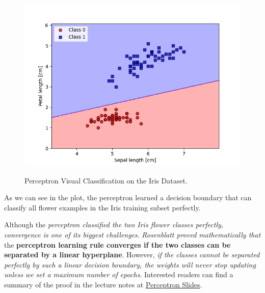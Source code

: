 \documentclass[../machine_learning_scikit.tex]{subfiles}
\begin{document}
    \begin{figure}[h]
        \begin{minipage}{\textwidth}
            \centering
            \includegraphics[scale=1]{images/perceptron_visual_implementation_iris_dataset.png} \\
            \caption{Perceptron Visual Classification on the Iris Dataset.}
            \label{figure:percepron_visual_classification_iris_dataset}
        \end{minipage}
    \end{figure}

    As we can see in the plot, the perceptron learned a decision boundary that can classify all flower examples in the Iris training subset perfectly.

    \begin{obs}
        Although the \textit{perceptron classified the two Iris flower classes perfectly, convergence is one of its biggest challenges}. \textit{Rosenblatt proved mathematically that} the \textbf{perceptron learning rule converges if the two classes can be separated by a linear hyperplane}. However, \textit{if the classes cannot be separated perfectly by such a linear decision boundary, the weights will never stop updating unless we set a maximum number of epochs}. Interested readers can find a summary of the proof in the lecture notes at \href{https://sebastianraschka.com/pdf/lecture-notes/stat453ss21/L03_perceptron_slides.pdf}{Perceptron Slides}.
    \end{obs}

    \newpage
\end{document}
